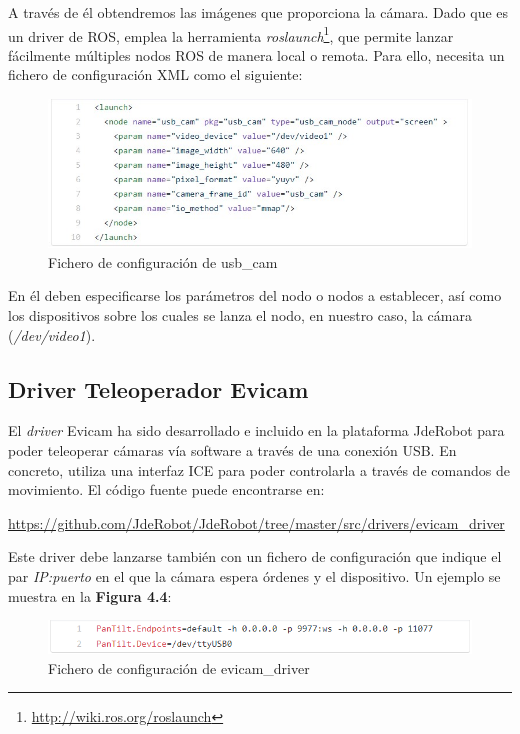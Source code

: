 A través de él obtendremos las imágenes que proporciona la cámara. Dado que es un driver de ROS, emplea la herramienta \textit{roslaunch}\footnote{\url{http://wiki.ros.org/roslaunch}}, que permite lanzar fácilmente múltiples nodos ROS de manera local o remota. Para ello, necesita un fichero de configuración XML como el siguiente: 

\begin{figure}[H]
  \begin{center}
    \includegraphics[width=0.99\linewidth]{figures/usbcamconf.jpg}
		\caption{Fichero de configuración de usb\_cam}
		\label{fig.usbcamconf}
		\end{center}
\end{figure}

En él deben especificarse los parámetros del nodo o nodos a establecer, así como los dispositivos sobre los cuales se lanza el nodo, en nuestro caso, la cámara (\textit{/dev/video1}).

\subsection{Driver Teleoperador Evicam}
El \textit{driver} Evicam ha sido desarrollado e incluido en la plataforma JdeRobot para poder teleoperar cámaras vía software a través de una conexión USB. En concreto, utiliza una interfaz ICE para poder controlarla a través de comandos de movimiento. 
El código fuente puede encontrarse en: 

\url{https://github.com/JdeRobot/JdeRobot/tree/master/src/drivers/evicam_driver}

Este driver debe lanzarse también con un fichero de configuración que indique el par \textit{IP:puerto} en el que la cámara espera órdenes y el dispositivo. Un ejemplo se muestra en la \textbf{Figura 4.4}:

\begin{figure}[H]
  \begin{center}
    \includegraphics[width=0.99\linewidth]{figures/evicamconf.png}
		\caption{Fichero de configuración de evicam\_driver}
		\label{fig.evicamconf}
		\end{center}
\end{figure}

